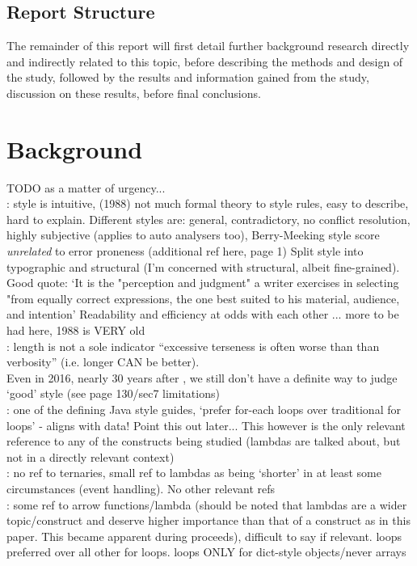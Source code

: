 \documentclass{article}
\begin{document}
    \subsection{Report Structure}
        The remainder of this report will first detail further background research directly and indirectly related to this topic, before describing the methods and design of the study, followed by the results and information gained from the study, discussion on these results, before final conclusions.
\newpage
\section{Background}
\label{sec:background}
TODO as a matter of urgency...
\\
\cite{paradigmForStyleResearch}: style is intuitive, (1988) not much formal theory to style rules, easy to describe, hard to explain. Different styles are: general, contradictory, no conflict resolution, highly subjective (applies to auto analysers too), Berry-Meeking style score \emph{unrelated} to error proneness (additional ref here, page 1) Split style into typographic and structural (I'm concerned with structural, albeit fine-grained).
Good quote: `It is the "perception and judgment" a writer exercises in selecting "from equally correct expressions, the one best suited to his material, audience, and intention'
Readability and efficiency at odds with each other
... more to be had here, 1988 is VERY old
\\
\cite{autoStyleFeedbackAtScale}: length is not a sole indicator ``excessive terseness is often worse than than verbosity'' (i.e. longer CAN be better).
\\
\cite{scaleDrivenHints} Even in 2016, nearly 30 years after \cite{paradigmForStyleResearch}, we still don't have a definite way to judge `good' style (see page 130/sec7 limitations)
\\
\cite{effectiveJava}: one of the defining Java style guides, `prefer for-each loops over traditional for loops' - aligns with data! Point this out later... This however is the only relevant reference to any of the constructs being studied (lambdas are talked about, but not in a directly relevant context)
\\
\cite{microsoftCSStyle}: no ref to ternaries, small ref to lambdas as being `shorter' in at least some circumstances (event handling). No other relevant refs
\\
\cite{googleJSStyle}: some ref to arrow functions/lambda (should be noted that lambdas are a wider topic/construct and deserve higher importance than that of a construct as in this paper. This became apparent during proceeds), difficult to say if relevant.  loops preferred over all other for loops.  loops ONLY for dict-style objects/never arrays
\end{document}
